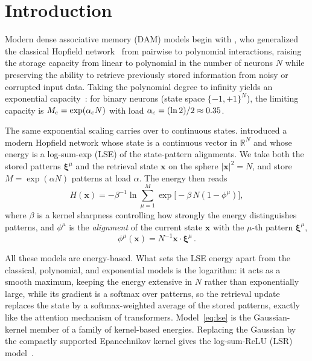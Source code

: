 \documentclass[letterpaper]{article} %
\newcommand{\bxi}{\boldsymbol{\xi}}
\newcommand{\bx}{\bm{x}}
\newcommand{\Bnet}{\beta}
\begin{document}
\section{Introduction}

Modern dense associative memory (DAM) models begin with \citet{krotov2016dense},
who generalized the classical Hopfield network~\citep{Hopfield1982} from pairwise
to polynomial interactions, raising the storage capacity from linear to
polynomial in the number of neurons $N$ while preserving the ability to
retrieve previously stored information from noisy or corrupted input data. 
Taking the polynomial degree to infinity yields an exponential capacity~\citep{demircigil2017model}:
for binary neurons (state space $\{-1,+1\}^{N}$), the limiting capacity is
$M_{\rm c} = \exp(\alpha_{\rm c} N)$ with load $\alpha_{\rm c} = (\ln 2)/2 \approx 0.35$.

The same exponential scaling carries over to continuous states.
\citet{ramsauer2021hopfield} introduced a modern Hopfield network whose state is
a continuous vector in $\mathbb{R}^N$ and whose energy is a log-sum-exp (LSE) of the state-pattern
alignments. We take both the stored patterns $\bxi^\mu$ and the retrieval state
$\bx$ on the sphere $|\bx|^2 = N$, and store $M = \exp(\alpha N)$ patterns at load $\alpha$. 
The energy then reads
\begin{equation}
H(\bx) = -\Bnet^{-1}\ln\sum_{\mu=1}^{M}\exp\!\big[-\Bnet\,N (1-\phi^\mu) \big],
\label{eq:lse}
\end{equation}
where $\Bnet$ is a kernel sharpness controlling how strongly the energy
distinguishes patterns, and $\phi^\mu$ is the \textit{alignment} of the current state $\bx$ 
with the $\mu$-th pattern $\bxi^\mu$,
\begin{equation}
    \phi^\mu(\bm{x}) = N^{-1} \bm{x} \cdot \bm{\xi}^\mu\,.
    \label{eq:alignment}
\end{equation}

All these models are energy-based. What sets the LSE energy apart from 
the classical, polynomial, and exponential models is the logarithm: 
it acts as a smooth maximum, keeping the energy extensive in $N$
rather than exponentially large, while its gradient is a softmax over patterns,
so the retrieval update replaces the state by a softmax-weighted average of the
stored patterns, exactly like the attention mechanism of transformers.
Model~\eqref{eq:lse} is the Gaussian-kernel member of a family of kernel-based
energies. Replacing the Gaussian by the compactly
supported Epanechnikov kernel gives the log-sum-ReLU (LSR)
model~\citep{hoover2025dense}.
\end{document}
